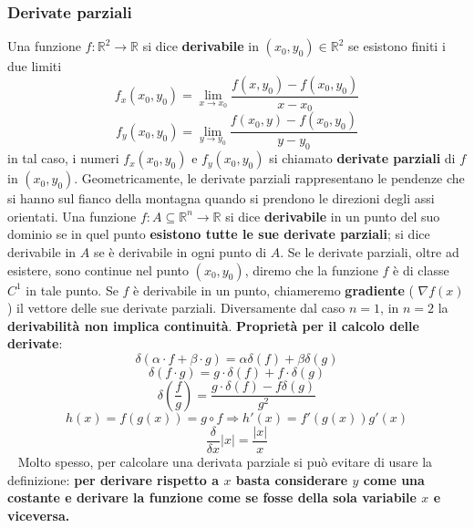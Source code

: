 \subsubsection{Derivate parziali}
Una funzione $f:\mathbb{R}^2 \rightarrow \mathbb{R}$ si dice \textbf{derivabile} in $(x_0,y_0) \in \mathbb{R}^2$ se esistono finiti i due limiti
\[
    f_x(x_0,y_0) = \lim_{x\rightarrow x_0} \frac{f(x,y_0)- f(x_0,y_0)}{x-x_0}
\]
\[
    f_y(x_0,y_0) = \lim_{y\rightarrow y_0} \frac{f(x_0,y) - f(x_0,y_0)}{y-y_0}
\]
in tal caso, i numeri $f_x(x_0,y_0)$ e $f_y(x_0,y_0)$ si chiamato \textbf{derivate parziali} di $f$ in $(x_0,y_0)$.
\newline
\newline
Geometricamente, le derivate parziali rappresentano le pendenze che si hanno sul fianco della montagna quando si prendono le direzioni degli assi orientati.\newline
\newline
Una funzione $f: A \subseteq \mathbb{R}^n \rightarrow  \mathbb{R}$ si dice \textbf{derivabile} in un punto del suo dominio se in quel punto \textbf{esistono tutte le sue derivate parziali}; si dice derivabile in $A$ se è derivabile in ogni punto di $A$.
\newline
\newline
Se le derivate parziali, oltre ad esistere, sono continue nel punto $(x_0, y_0)$, diremo che la funzione $f$ è di classe $C^1$ in tale punto.\newline
\newline
Se $f$ è derivabile in un punto, chiameremo \textbf{gradiente} ( $\nabla f(x)$ ) il vettore delle sue derivate parziali.\newline
\newline
Diversamente dal caso $n=1$, in $n=2$ la \textbf{derivabilità non implica continuità}.\newline
\newline
\textbf{Proprietà per il calcolo delle derivate}:
\[
    \delta(\alpha \cdot f + \beta \cdot g) = \alpha \delta(f) + \beta \delta (g)
\]
\[
    \delta(f \cdot  g) = g \cdot \delta(f) + f  \cdot \delta(g)
\]
\[
    \delta\left(\frac{f}{g}\right) = \frac{ g \cdot \delta(f) - f \delta(g)}{g^2}
\]
\[
    h(x) = f(g(x)) = g \circ f \Rightarrow h'(x) = f'(g(x)) g'(x)
\]
\[
    \frac{\delta}{\delta x} |x| = \frac{|x|}{x} 
\]
\ \newline
Molto spesso, per calcolare una derivata parziale si può evitare di usare la definizione: \textbf{per derivare rispetto a $x$ basta considerare $y$ come una costante e derivare la funzione come se fosse della sola variabile $x$ e viceversa.}\newline
